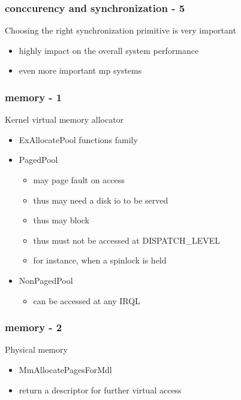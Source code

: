
\begin{frame}
 \frametitle{conccurency and synchronization - 5}

 Choosing the right synchronization primitive is very important

 \begin{itemize}
  \item highly impact on the overall system performance
  \item even more important mp systems
 \end{itemize}

\end{frame}


\begin{frame}
 \frametitle{memory - 1}

 Kernel virtual memory allocator

 \begin{itemize}
  \item ExAllocatePool functions family

  \item PagedPool
  \begin{itemize}
   \item may page fault on access
   \item thus may need a disk io to be served
   \item thus may block
   \item thus must not be accessed at DISPATCH\_LEVEL
   \item for instance, when a spinlock is held
  \end{itemize}

  \item NonPagedPool
  \begin{itemize}
   \item can be accessed at any IRQL
  \end{itemize}

 \end{itemize}

\end{frame}


\begin{frame}
 \frametitle{memory - 2}

 Physical memory

 \begin{itemize}
  \item MmAllocatePagesForMdl
  \item return a descriptor for further virtual access
 \end{itemize}

\end{frame}

